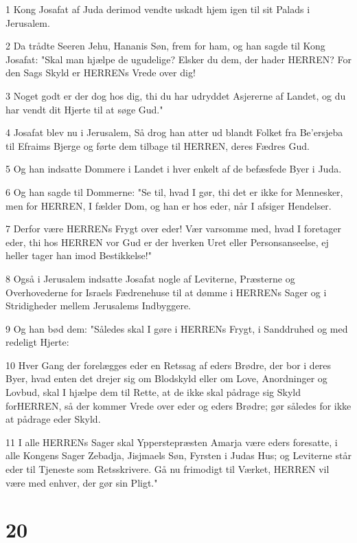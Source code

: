 \par 1 Kong Josafat af Juda derimod vendte uskadt hjem igen til sit Palads i Jerusalem.
\par 2 Da trådte Seeren Jehu, Hananis Søn, frem for ham, og han sagde til Kong Josafat: "Skal man hjælpe de ugudelige? Elsker du dem, der hader HERREN? For den Sags Skyld er HERRENs Vrede over dig!
\par 3 Noget godt er der dog hos dig, thi du har udryddet Asjererne af Landet, og du har vendt dit Hjerte til at søge Gud."
\par 4 Josafat blev nu i Jerusalem, Så drog han atter ud blandt Folket fra Be'ersjeba til Efraims Bjerge og førte dem tilbage til HERREN, deres Fædres Gud.
\par 5 Og han indsatte Dommere i Landet i hver enkelt af de befæsfede Byer i Juda.
\par 6 Og han sagde til Dommerne: "Se til, hvad I gør, thi det er ikke for Mennesker, men for HERREN, I fælder Dom, og han er hos eder, når I afsiger Hendelser.
\par 7 Derfor være HERRENs Frygt over eder! Vær varsomme med, hvad I foretager eder, thi hos HERREN vor Gud er der hverken Uret eller Personsanseelse, ej heller tager han imod Bestikkelse!"
\par 8 Også i Jerusalem indsatte Josafat nogle af Leviterne, Præsterne og Overhovederne for Israels Fædrenehuse til at dømme i HERRENs Sager og i Stridigheder mellem Jerusalems Indbyggere.
\par 9 Og han bød dem: "Således skal I gøre i HERRENs Frygt, i Sanddruhed og med redeligt Hjerte:
\par 10 Hver Gang der forelægges eder en Retssag af eders Brødre, der bor i deres Byer, hvad enten det drejer sig om Blodskyld eller om Love, Anordninger og Lovbud, skal I hjælpe dem til Rette, at de ikke skal pådrage sig Skyld forHERREN, så der kommer Vrede over eder og eders Brødre; gør således for ikke at pådrage eder Skyld.
\par 11 I alle HERRENs Sager skal Ypperstepræsten Amarja være eders foresatte, i alle Kongens Sager Zebadja, Jisjmaels Søn, Fyrsten i Judas Hus; og Leviterne står eder til Tjeneste som Retsskrivere. Gå nu frimodigt til Værket, HERREN vil være med enhver, der gør sin Pligt."

\chapter{20}

